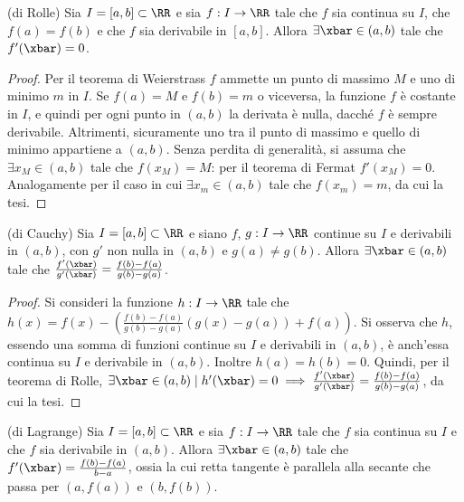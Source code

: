 \documentclass[11pt]{article}
\begin{document}
	\begin{theorem} (di Rolle)
		Sia $I = [a, b] \subset \RR$ e sia $f : I \to \RR$ tale che
		$f$ sia continua su $I$, che $f(a) = f(b)$ e che $f$ sia derivabile
		in $[a, b]$. Allora $\exists \xbar \in (a, b)$ tale che $f'(\xbar) = 0$.
	\end{theorem}

	\begin{proof}
		Per il teorema di Weierstrass $f$ ammette un punto di massimo $M$ e uno di minimo $m$ in $I$. Se $f(a) = M$ e $f(b) = m$ o viceversa, la
		funzione $f$ è costante in $I$, e quindi per ogni punto in $(a, b)$
		la derivata è nulla, dacché $f$ è sempre derivabile. Altrimenti,
		sicuramente uno tra il punto di massimo e quello di minimo appartiene
		a $(a, b)$. Senza perdita di generalità, si assuma che $\exists x_M \in (a, b)$ tale che $f(x_M) = M$: per
		il teorema di Fermat $f'(x_M) = 0$. Analogamente per il caso in cui
		$\exists x_m \in (a, b)$ tale che $f(x_m) = m$, da cui la tesi.
	\end{proof}

	\begin{theorem} (di Cauchy)
		Sia $I = [a, b] \subset \RR$ e siano $f$, $g: I \to \RR$
		continue su $I$ e derivabili in $(a, b)$, con $g'$ non nulla
		in $(a, b)$ e $g(a) \neq g(b)$. Allora
		$\exists \xbar \in (a, b)$ tale che $\frac{f'(\xbar)}{g'(\xbar)} = \frac{f(b) - f(a)}{g(b)-g(a)}$.
	\end{theorem}

	\begin{proof}
		Si consideri la funzione $h : I \to \RR$ tale che $h(x) = f(x) - \left(\frac{f(b) - f(a)}{g(b) - g(a)} (g(x) - g(a)) + f(a)\right)$.
		Si osserva che $h$,
		essendo una somma di funzioni continue su $I$ e derivabili in $(a, b)$,
		è anch'essa continua su $I$ e derivabile in $(a, b)$. Inoltre
		$h(a) = h(b) = 0$. Quindi, per il teorema di Rolle, $\exists \xbar \in (a, b) \mid h'(\xbar) = 0 \implies \frac{f'(\xbar)}{g'(\xbar)} = \frac{f(b)-f(a)}{g(b)-g(a)}$,
		da cui la tesi.
	\end{proof}

	\begin{theorem} (di Lagrange)
		Sia $I = [a, b] \subset \RR$ e sia $f: I \to \RR$ tale che $f$
		sia continua su $I$ e che $f$ sia derivabile in $(a, b)$. Allora
		$\exists \xbar \in (a, b)$ tale che $f'(\xbar) = \frac{f(b) - f(a)}{b-a}$, ossia la cui retta tangente è parallela alla secante
		che passa per $(a, f(a))$ e $(b, f(b))$.
	\end{theorem}
\end{document}
